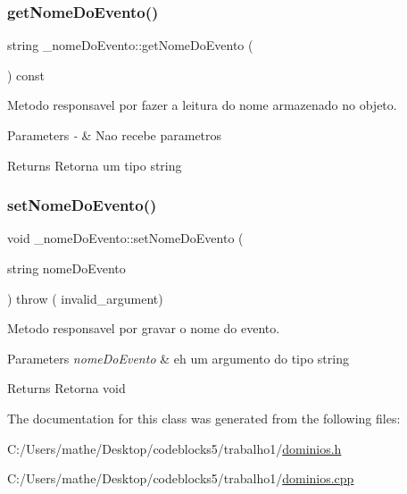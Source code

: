 \subsubsection{\texorpdfstring{getNomeDoEvento()}{getNomeDoEvento()}}
{\footnotesize\ttfamily string \+\_\+nome\+Do\+Evento\+::get\+Nome\+Do\+Evento (\begin{DoxyParamCaption}{ }\end{DoxyParamCaption}) const\hspace{0.3cm}{\ttfamily [inline]}}



Metodo responsavel por fazer a leitura do nome armazenado no objeto. 


\begin{DoxyParams}{Parameters}
{\em -\/} & Nao recebe parametros \\
\hline
\end{DoxyParams}
\begin{DoxyReturn}{Returns}
Retorna um tipo string 
\end{DoxyReturn}
\mbox{\label{class__nome_do_evento_a30bf17a8e762fa948df7efd22c4e8450}} 
\subsubsection{\texorpdfstring{setNomeDoEvento()}{setNomeDoEvento()}}
{\footnotesize\ttfamily void \+\_\+nome\+Do\+Evento\+::set\+Nome\+Do\+Evento (\begin{DoxyParamCaption}\item[{string}]{nome\+Do\+Evento }\end{DoxyParamCaption}) throw ( invalid\+\_\+argument) }



Metodo responsavel por gravar o nome do evento. 


\begin{DoxyParams}{Parameters}
{\em nome\+Do\+Evento} & eh um argumento do tipo string \\
\hline
\end{DoxyParams}
\begin{DoxyReturn}{Returns}
Retorna void 
\end{DoxyReturn}


The documentation for this class was generated from the following files\+:\begin{DoxyCompactItemize}
\item 
C\+:/\+Users/mathe/\+Desktop/codeblocks5/trabalho1/\mbox{\hyperlink{dominios_8h}{dominios.\+h}}\item 
C\+:/\+Users/mathe/\+Desktop/codeblocks5/trabalho1/\mbox{\hyperlink{dominios_8cpp}{dominios.\+cpp}}\end{DoxyCompactItemize}
